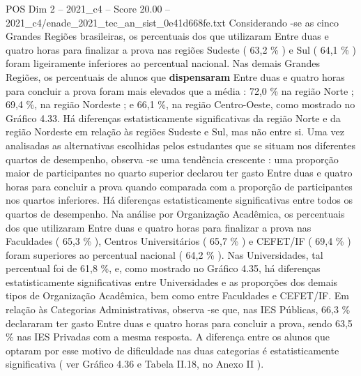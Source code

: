 \begin{textsample}{POS Dim 2 – 2021\_c4 – Score 20.00 – 2021\_c4/enade\_2021\_tec\_an\_sist\_0e41d668fe.txt}
Considerando -se as cinco Grandes Regiões brasileiras, os percentuais dos que utilizaram Entre duas e quatro horas para finalizar a prova nas regiões Sudeste ( 63,2 \% ) e Sul ( 64,1 \% ) foram ligeiramente inferiores ao percentual nacional.
Nas demais Grandes Regiões, os percentuais de alunos que \textbf{dispensaram} Entre duas e quatro horas para concluir a prova foram mais elevados que a média : 72,0 \% na região Norte ; 69,4 \%, na região Nordeste ; e 66,1 \%, na região Centro-Oeste, como mostrado no Gráfico 4.33.
Há diferenças estatisticamente significativas da região Norte e da região Nordeste em relação às regiões Sudeste e Sul, mas não entre si.
Uma vez analisadas as alternativas escolhidas pelos estudantes que se situam nos diferentes quartos de desempenho, observa -se uma tendência crescente : uma proporção maior de participantes no quarto superior declarou ter gasto Entre duas e quatro horas para concluir a prova quando comparada com a proporção de participantes nos quartos inferiores.
Há diferenças estatisticamente significativas entre todos os quartos de desempenho.
Na análise por Organização Acadêmica, os percentuais dos que utilizaram Entre duas e quatro horas para finalizar a prova nas Faculdades ( 65,3 \% ), Centros Universitários ( 65,7 \% ) e CEFET/IF ( 69,4 \% ) foram superiores ao percentual nacional ( 64,2 \% ).
Nas Universidades, tal percentual foi de 61,8 \%, e, como mostrado no Gráfico 4.35, há diferenças estatisticamente significativas entre Universidades e as proporções dos demais tipos de Organização Acadêmica, bem como entre Faculdades e CEFET/IF.
Em relação às Categorias Administrativas, observa -se que, nas IES Públicas, 66,3 \% declararam ter gasto Entre duas e quatro horas para concluir a prova, sendo 63,5 \% nas IES Privadas com a mesma resposta.
A diferença entre os alunos que optaram por esse motivo de dificuldade nas duas categorias é estatisticamente significativa ( ver Gráfico 4.36 e Tabela II.18, no Anexo II ).

\end{textsample}
